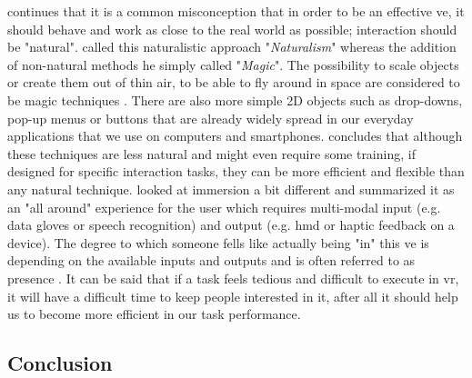 \cite{Bowman2002} continues that it is a common misconception that in order to be an effective \gls{ve}, it should behave and work as close to the real world as possible; interaction should be "natural". \cite{Smith1987} called this naturalistic approach "\textit{Naturalism}" whereas the addition of non-natural methods he simply called "\textit{Magic}". The possibility to scale objects or create them out of thin air, to be able to fly around in space are considered to be magic techniques \citep{Bowman2002}. There are also more simple 2D objects such as drop-downs, pop-up menus or buttons that are already widely spread in our everyday applications that we use on computers and smartphones. \cite{Bowman2002} concludes that although these techniques are less natural and might even require some training, if designed for specific interaction tasks, they can be more efficient and flexible than any natural technique.\newline
\cite{Rosson2002} looked at immersion a bit different and summarized it as an "all around" experience for the user which requires multi-modal input (e.g. data gloves or speech recognition) and output (e.g. \gls{hmd} or haptic feedback on a device). The degree to which someone fells like actually being "in" this \gls{ve} is depending on the available inputs and outputs and is often referred to as presence \citep{Rosson2002}.\newline
It can be said that if a task feels tedious and difficult to execute in \gls{vr}, it will have a difficult time to keep people interested in it, after all it should help us to become more efficient in our task performance.



\subsection{Conclusion}

